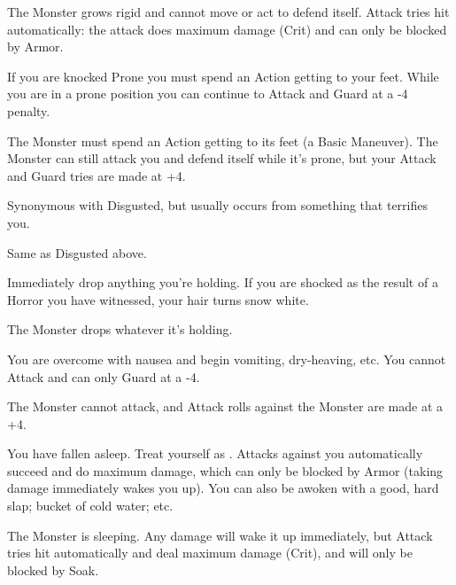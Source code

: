 \begin{multicols*}{2}
     The Monster grows rigid and cannot move or act to defend itself.  Attack tries hit automatically: the attack does maximum damage (Crit) and can only be blocked by Armor.


  If you are knocked Prone you must spend an Action getting to your feet.  While you are in a prone position you can continue to Attack and Guard at a -4 penalty.
  
    The Monster must spend an Action getting to its feet (a Basic Maneuver).  The Monster can still attack you and defend itself while it's prone, but your Attack and Guard tries are made at +4.


  Synonymous with Disgusted, but usually occurs from something that terrifies you.

   Same as Disgusted above.


  Immediately drop anything you're holding.  If you are shocked as the result of a Horror you have witnessed, your hair turns snow white.

     The Monster drops whatever it's holding.



  You are overcome with nausea and begin vomiting, dry-heaving, etc.  You cannot Attack and can only Guard at a -4.

     The Monster cannot attack, and Attack rolls against the Monster are made at a +4.

\newpage


  You have fallen asleep.  Treat yourself as .  Attacks against you automatically succeed and do maximum damage, which can only be blocked by Armor (taking damage immediately wakes you up).  You can also be awoken with a good, hard slap; bucket of cold water; etc.

       The Monster is sleeping.  Any damage will wake it up immediately, but Attack tries hit automatically and deal maximum damage (Crit), and will only be blocked by Soak.



\end{multicols*}

